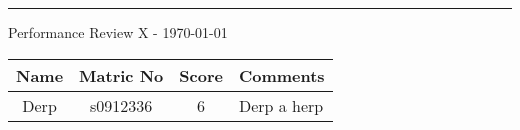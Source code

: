 \documentclass[10pt, a4paper]{article} %
\begin{document}
\textbf{\huge{}} %

\vspace{-10pt}
\rule{\columnwidth}{1pt}  %

Performance Review X - \today %


\begin{tabular}{c c c l}
    \textbf{Name} &
    \textbf{Matric No} &
    \textbf{Score} &
    \textbf{Comments}\\

    \hline

    Derp&
    s0912336&
    6&
    Derp a herp\\


\end{tabular}
\end{document}
